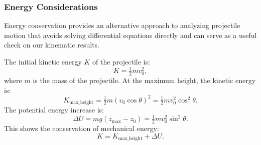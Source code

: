 \exampleline




\subsubsection*{Energy Considerations}

\noindent Energy conservation provides an alternative approach to analyzing projectile motion that avoids solving differential equations directly and can serve as a useful check on our kinematic results.

\noindent The initial kinetic energy \( K \) of the projectile is:
\[
K = \tfrac{1}{2} m v_0^2,
\]
where \( m \) is the mass of the projectile. At the maximum height, the kinetic energy is:
\[
K_{\text{max\_height}} = \tfrac{1}{2} m \left( v_0 \cos \theta \right)^2 = \tfrac{1}{2} m v_0^2 \cos^2 \theta.
\]
\noindent The potential energy increase is:
\[
\Delta U = m g (z_{\text{max}} - z_0) = \tfrac{1}{2} m v_0^2 \sin^2 \theta.
\]
\noindent This shows the conservation of mechanical energy:
\[
K = K_{\text{max\_height}} + \Delta U.
\]

